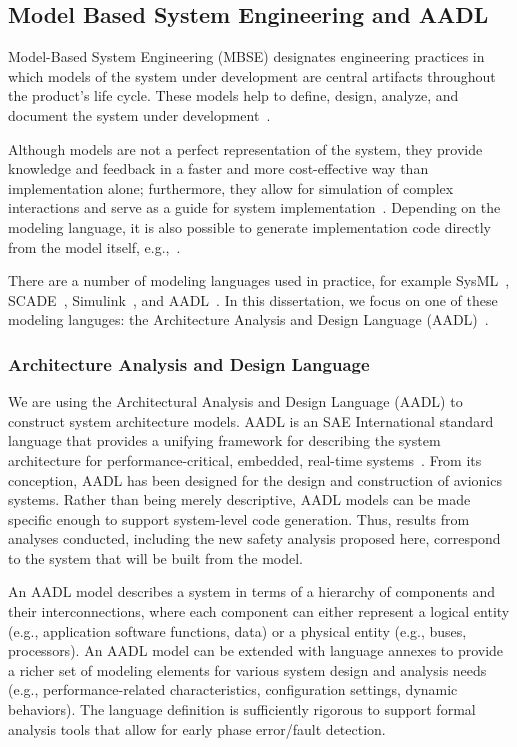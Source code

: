 \subsection{Model Based System Engineering and AADL}
Model-Based System Engineering (MBSE) designates engineering practices in which models of the system under development are central artifacts throughout the product's life cycle. These models help to define, design, analyze, and document the system under development~\cite{FeilerModelBasedEngineering2012}. 

Although models are not a perfect representation of the system, they provide knowledge and feedback in a faster and more cost-effective way than implementation alone; furthermore, they allow for simulation of complex interactions and serve as a guide for system implementation~\cite{INCOSE}. Depending on the modeling language, it is also possible to generate implementation code directly from the model itself, e.g.,~\cite{friedenthal2014practical,AADL_Standard,dabney2004mastering}. 

There are a number of modeling languages used in practice, for example SysML~\cite{friedenthal2014practical}, SCADE~\cite{abdulla2004designing}, Simulink~\cite{dabney2004mastering}, and AADL~\cite{FeilerModelBasedEngineering2012}. In this dissertation, we focus on one of these modeling languges: the Architecture Analysis and Design Language (AADL)~\cite{FeilerModelBasedEngineering2012}.

\subsubsection{Architecture Analysis and Design Language}
We are using the Architectural Analysis and Design Language (AADL) to construct system architecture models.  AADL is an SAE International standard language that provides a unifying framework for describing the system architecture for performance-critical, embedded, real-time systems~\cite{AADL_Standard,FeilerModelBasedEngineering2012}. From its conception, AADL has been designed for the design and construction of avionics systems.  Rather than being merely descriptive, AADL models can be made specific enough to support system-level code generation.  Thus, results from analyses conducted, including the new safety analysis proposed here, correspond to the system that will be built from the model.  
 
An AADL model describes a system in terms of a hierarchy of components and their interconnections, where each component can either represent a logical entity (e.g., application software functions, data) or a physical entity (e.g., buses, processors). An AADL model can be extended with language annexes to provide a richer set of modeling elements for various system design and analysis needs (e.g., performance-related characteristics, configuration settings, dynamic behaviors). The language definition is sufficiently rigorous to support formal analysis tools that allow for early phase error/fault detection.

